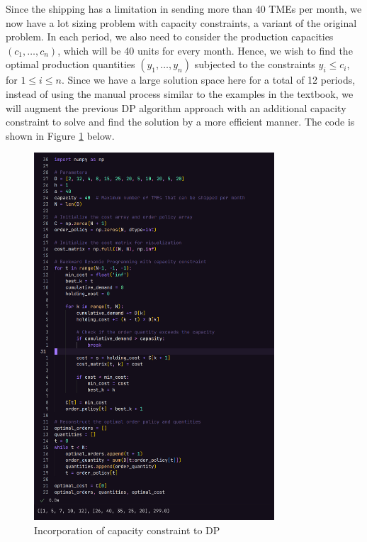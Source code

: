 \documentclass[12pt]{article}
\begin{document}
Since the shipping has a limitation in sending more than 40 TMEs per month, we now have a lot sizing problem with capacity constraints, a variant of the original problem. In each period, we also need to consider the production capacities $(c_{1}, \dots , c_n)$, which will be 40 units for every month. Hence, we wish to find the optimal production quantities $(y_{1}, \dots, y_n)$ subjected to the constraints $y_i \leq c_i$, for $1 \leq i \leq n$. Since we have a large solution space here for a total of 12 periods, instead of using the manual process similar to the examples in the textbook, we will augment the previous DP algorithm approach with an additional capacity constraint to solve and find the solution by a more efficient manner. The code is shown in Figure \ref{fig:2-capacityconstraint} below. 

\begin{figure}[H]
    \centering
    \includegraphics[width=0.8\textwidth]{Images/capacityconstraint.png}
    \caption{Incorporation of capacity constraint to DP}
    \label{fig:2-capacityconstraint}
\end{figure} 
\end{document}
